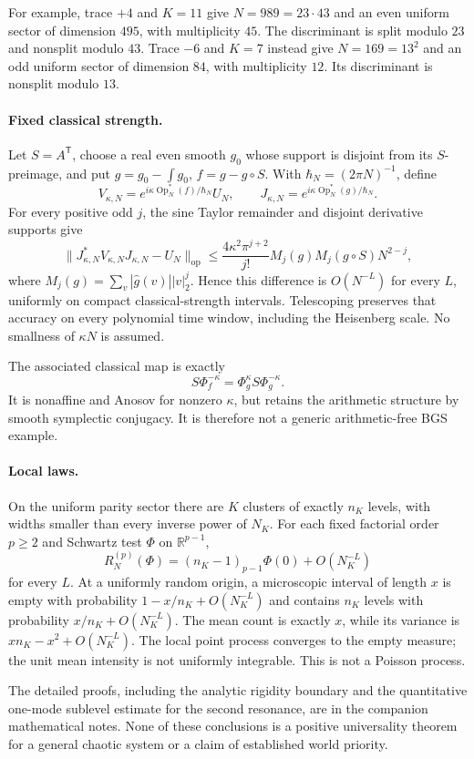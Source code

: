 For example, trace $+4$ and $K=11$ give $N=989=23\cdot43$ and an even
uniform sector of dimension $495$, with multiplicity $45$. The discriminant
is split modulo $23$ and nonsplit modulo $43$. Trace $-6$ and $K=7$ instead
give $N=169=13^2$ and an odd uniform sector of dimension $84$, with
multiplicity $12$. Its discriminant is nonsplit modulo $13$.

\paragraph{Fixed classical strength.}
Let $S=A^{\mathsf T}$, choose a real even smooth $g_0$ whose support is
disjoint from its $S$-preimage, and put $g=g_0-\int g_0$, $f=g-g\circ S$.
With $\hbar_N=(2\pi N)^{-1}$, define
\[
 V_{\kappa,N}=e^{i\kappa\operatorname{Op}_N^*(f)/\hbar_N}U_N,
 \qquad J_{\kappa,N}=e^{i\kappa\operatorname{Op}_N^*(g)/\hbar_N}.
\]
For every positive odd $j$, the sine Taylor remainder and disjoint derivative
supports give
\[
 \|J_{\kappa,N}^*V_{\kappa,N}J_{\kappa,N}-U_N\|_{\mathrm{op}}
 \leq\frac{4\kappa^2\pi^{j+2}}{j!}
 M_j(g)M_j(g\circ S)N^{2-j},
\]
where $M_j(g)=\sum_v|\widehat g(v)||v|_2^j$. Hence this difference is
$O(N^{-L})$ for every $L$, uniformly on compact classical-strength intervals.
Telescoping preserves that accuracy on every polynomial time window,
including the Heisenberg scale. No smallness of $\kappa N$ is assumed.

The associated classical map is exactly
\[
 S\Phi_f^{-\kappa}=\Phi_g^\kappa S\Phi_g^{-\kappa}.
\]
It is nonaffine and Anosov for nonzero $\kappa$, but retains the arithmetic
structure by smooth symplectic conjugacy. It is therefore not a generic
arithmetic-free BGS example.

\paragraph{Local laws.}
On the uniform parity sector there are $K$ clusters of exactly $n_K$ levels,
with widths smaller than every inverse power of $N_K$. For each fixed
factorial order $p\geq2$ and Schwartz test $\Phi$ on $\mathbb R^{p-1}$,
\[
 R_N^{(p)}(\Phi)=(n_K-1)_{p-1}\Phi(0)+O(N_K^{-L})
\]
for every $L$. At a uniformly random origin, a microscopic interval of
length $x$ is empty with probability $1-x/n_K+O(N_K^{-L})$ and contains
$n_K$ levels with probability $x/n_K+O(N_K^{-L})$. The mean count is exactly
$x$, while its variance is $xn_K-x^2+O(N_K^{-L})$. The local point process
converges to the empty measure; the unit mean intensity is not uniformly
integrable. This is not a Poisson process.

The detailed proofs, including the analytic rigidity boundary and the
quantitative one-mode sublevel estimate for the second resonance, are in the
companion mathematical notes. None of these conclusions is a positive
universality theorem for a general chaotic system or a claim of established
world priority.
